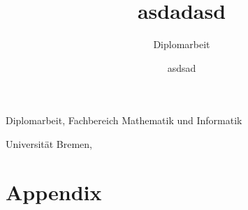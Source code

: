 \documentclass{thesis}
\author{asdsad}
\title{asdadasd}
\subtitle{Diplomarbeit}
\begin{document}
\maketitle

\clearpage
\thispagestyle{empty}\small
\null\vfill

\makeatletter
  \textbf{\@author}\par
  \@title\par
  \ifthesis@hassubtitle\@subtitleshort\fi

  Diplomarbeit, Fachbereich Mathematik und Informatik\par
  Universität Bremen, \monthyear
\makeatother

\normalsize

\clearpage


\frontmatter
{}
{}
\tableofcontents


\cleardoublepage



\mainmatter


%
%

\appendix
\chapter{Appendix}

\end{document}
